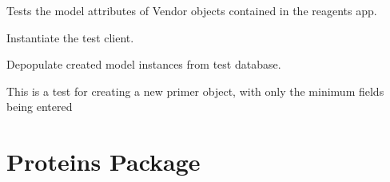 \documentclass[letterpaper,10pt,english]{sphinxmanual}
\begin{document}
\begin{fulllineitems}
\label{api:experimentdb.external.tests.VendorModelTests}
Tests the model attributes of Vendor objects contained in the reagents app.

\begin{fulllineitems}
\label{api:experimentdb.external.tests.VendorModelTests.setUp}
Instantiate the test client.

\end{fulllineitems}


\begin{fulllineitems}
\label{api:experimentdb.external.tests.VendorModelTests.tearDown}
Depopulate created model instances from test database.

\end{fulllineitems}


\begin{fulllineitems}
\label{api:experimentdb.external.tests.VendorModelTests.test_create_vendor_minimal}
This is a test for creating a new primer object, with only the minimum fields being entered

\end{fulllineitems}


\begin{fulllineitems}
\label{api:experimentdb.external.tests.VendorModelTests.test_vendor_absolute_url}
\end{fulllineitems}


\end{fulllineitems}



\section{Proteins Package}
\label{api:module-experimentdb.proteins}\label{api:proteins-package}
\end{document}
